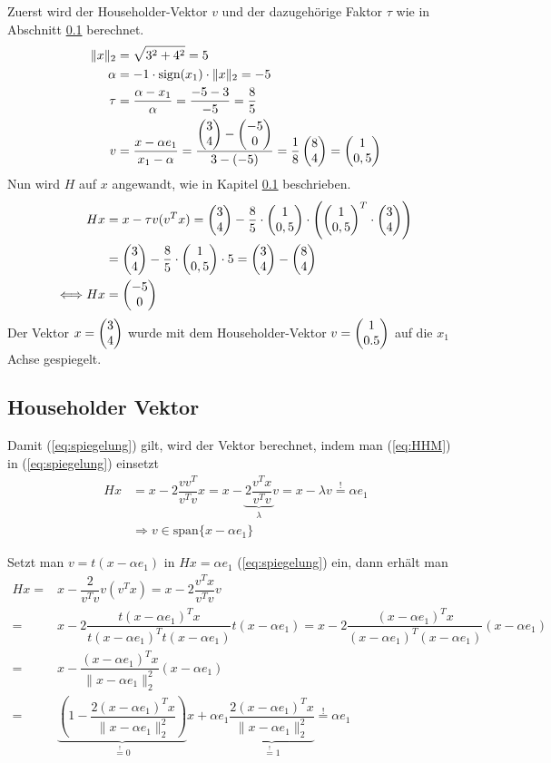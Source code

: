 Zuerst wird der Householder-Vektor $v$ und der dazugehörige Faktor $\tau$ wie in Abschnitt \ref{sec:HHvec} berechnet.
\begin{align*}
	\|x\|_2 &= \sqrt{3^2 + 4^2} = 5\\
	\alpha &= -1 \cdot \text{sign}(x_1) \cdot \|x\|_2 = -5 \\
	\tau &= \dfrac{\alpha - x_1}{\alpha} = \dfrac{-5 - 3}{-5} = \dfrac{8}{5} \\
	v &=\dfrac{x - \alpha e_1}{x_1 - \alpha} = \dfrac{\begin{pmatrix} 3\\4 \end{pmatrix} - \begin{pmatrix} -5\\0 \end{pmatrix}}{3- (-5)} = \dfrac{1}{8} \begin{pmatrix} 8\\4 \end{pmatrix} = \begin{pmatrix} 1\\0,5 \end{pmatrix}
\end{align*}
Nun wird $H$ auf $x$ angewandt, wie in Kapitel \ref{sec:HHvec} beschrieben.
\begin{align*}
	Hx &= x - \tau v (v^T x) = \begin{pmatrix} 3\\4 \end{pmatrix} - \dfrac{8}{5} \cdot \begin{pmatrix} 1\\0,5 \end{pmatrix} \cdot \left(  \begin{pmatrix} 1\\0,5 \end{pmatrix}^T \cdot \begin{pmatrix} 3\\4 \end{pmatrix} \right)\\
	&= \begin{pmatrix} 3\\4 \end{pmatrix} - \dfrac{8}{5} \cdot \begin{pmatrix} 1\\0,5 \end{pmatrix} \cdot 5 = \begin{pmatrix} 3\\4 \end{pmatrix} - \begin{pmatrix} 8\\4 \end{pmatrix} \\
	\Longleftrightarrow Hx&= \begin{pmatrix} -5\\0 \end{pmatrix}
\end{align*}
Der Vektor $x = \begin{pmatrix} 3\\4 \end{pmatrix}$ wurde mit dem Householder-Vektor $v= \begin{pmatrix} 1\\0.5 \end{pmatrix}$ auf die $x_1$ Achse gespiegelt.

\subsection{Householder Vektor} \label{sec:HHvec}
Damit (\ref{eq:spiegelung}) gilt, wird der Vektor berechnet, 
indem man (\ref{eq:HHM}) in (\ref{eq:spiegelung}) einsetzt
\begin{align*}
Hx &= x - 2\dfrac{vv^T}{v^Tv} x = x - \underbrace{2\dfrac{v^Tx}{v^Tv}}_{\lambda} v = x - \lambda v \overset{!}{=} \alpha e_1 \\
&\Longrightarrow v \in \text{span}\{x - \alpha e_1\}
\end{align*}

Setzt man $v = t(x - \alpha e_1)$ in $Hx = \alpha e_1 $ (\ref{eq:spiegelung}) ein, dann erhält man 
\begin{align}
Hx =& x - \dfrac{2}{v^Tv}v(v^Tx) = x - 2\dfrac{v^Tx}{v^Tv}v \nonumber \\
=& x - 2\dfrac{ t(x - \alpha e_1)^Tx}{ t(x - \alpha e_1)^T t(x - \alpha e_1)} t(x - \alpha e_1)
= x - 2\dfrac{ (x - \alpha e_1)^Tx}{ (x - \alpha e_1)^T (x - \alpha e_1)} (x - \alpha e_1)
\nonumber \\
=& x - \dfrac{(x - \alpha e_1)^Tx}{\|x - \alpha e_1\|_2^2} (x - \alpha e_1) \nonumber \\
=&\underbrace{\left(1 - \dfrac{2(x - \alpha e_1)^Tx}{\|x - \alpha e_1\|_2^2}\right)}_{ \overset{!}{=} 0 } x + \alpha e_1 \underbrace{\dfrac{2(x - \alpha e_1)^Tx}{\|x - \alpha e_1\|_2^2} }_{\overset{!}{=} 1} \overset{!}{=} \alpha e_1 \label{lasteq}
\end{align}


